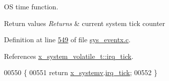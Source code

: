 O\+S time function. 


\begin{DoxyRetVals}{Return values}
{\em Returns} & current system tick counter \\
\hline
\end{DoxyRetVals}


Definition at line \hyperlink{a00037_source_l00549}{549} of file \hyperlink{a00037_source}{sys\+\_\+eventx.\+c}.



References \hyperlink{a00037_source_l00098}{x\+\_\+system\+\_\+volatile\+\_\+t\+::irq\+\_\+tick}.


\begin{DoxyCode}
00550 \{
00551     \textcolor{keywordflow}{return} \hyperlink{a00037_ad839c033d3d00cdcc6032038182be270}{x\_systemv}.\hyperlink{a00037_ab73fa103937ad39e7e2fc55783c4c370}{irq\_tick};
00552 \}
\end{DoxyCode}
